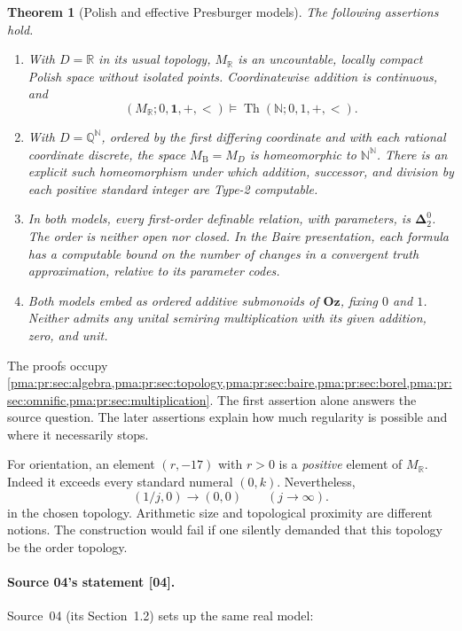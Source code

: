 \documentclass[11pt]{article}
\numberwithin{equation}{section}
\newtheorem{theorem}{Theorem}[section]
\theoremstyle{definition}
\theoremstyle{remark}
\newcommand{\N}{\mathbb N}
\newcommand{\Q}{\mathbb Q}
\newcommand{\R}{\mathbb R}
\newcommand{\Oz}{\mathbf{Oz}}
\newcommand{\Baire}{\N^{\N}}
\newcommand{\MR}{M_{\R}}
\newcommand{\MB}{M_{\mathrm B}}
\newcommand{\MD}{M_D}
\newcommand{\Th}{\operatorname{Th}}
\newcommand{\one}{\mathbf 1}
\newcommand{\Dtwo}{\boldsymbol{\Delta}^{0}_{2}}
\newcommand{\src}[1]{\textup{\textsf{\small[#1]}}}
\begin{document}
\begin{theorem}[Polish and effective Presburger models]
\label{pma:pr:thm:main}
The following assertions hold.
\begin{enumerate}[label=\textup{(\arabic*)}]
\item With $D=\R$ in its usual topology, $\MR$ is an uncountable,
locally compact Polish space without isolated points. Coordinatewise
addition is continuous, and
\[
 (\MR;0,\one,+,<)\models\Th(\N;0,1,+,<).
\]
\item With $D=\Q^{\N}$, ordered by the first differing coordinate and
with each rational coordinate discrete, the space $\MB=\MD$ is
homeomorphic to $\Baire$. There is an explicit such homeomorphism under
which addition, successor, and division by each positive standard integer
are Type-2 computable.
\item In both models, every first-order definable relation, with
parameters, is $\Dtwo$. The order is neither open nor closed. In the Baire
presentation, each formula has a computable bound on the number of
changes in a convergent truth approximation, relative to its parameter
codes.
\item Both models embed as ordered additive submonoids of $\Oz$, fixing
$0$ and $1$. Neither admits any unital semiring multiplication with its
given addition, zero, and unit.
\end{enumerate}
\end{theorem}

The proofs occupy \cref{pma:pr:sec:algebra,pma:pr:sec:topology,pma:pr:sec:baire,pma:pr:sec:borel,pma:pr:sec:omnific,pma:pr:sec:multiplication}.
The first assertion alone answers the source question. The later assertions
explain how much regularity is possible and where it necessarily stops.

For orientation, an element $(r,-17)$ with $r>0$ is a \emph{positive}
element of $\MR$. Indeed it exceeds every standard numeral $(0,k)$.
Nevertheless,
\begin{equation}
 (1/j,0)\longrightarrow(0,0)
 \qquad(j\longrightarrow\infty).
 \label{pma:pr:eq:smallseq}
\end{equation}
in the chosen topology. Arithmetic size and topological proximity are
different notions. The construction would fail if one silently demanded
that this topology be the order topology.

\paragraph{Source 04's statement \src{04}.} Source~04 (its Section~1.2) sets
up the same real model:
\end{document}
